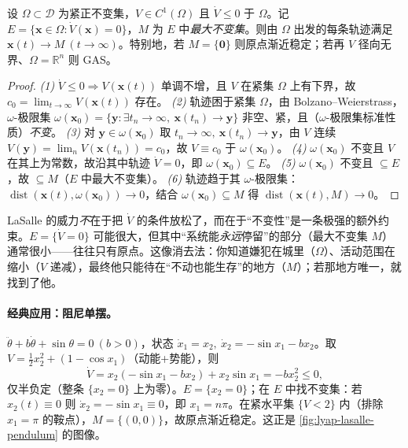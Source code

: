\begin{theorem}
\label{thm:lyap-lasalle-full}
设 $\Omega\subset\mathcal{D}$ 为紧正不变集，$V\in C^1(\Omega)$ 且 $\dot V\le0$ 于 $\Omega$。记 $E=\{\mathbf{x}\in\Omega:\dot V(\mathbf{x})=0\}$，$M$ 为 $E$ 中\emph{最大不变集}。则由 $\Omega$ 出发的每条轨迹满足 $\mathbf{x}(t)\to M\ (t\to\infty)$。特别地，若 $M=\{\mathbf{0}\}$ 则原点渐近稳定；若再 $V$ 径向无界、$\Omega=\mathbb{R}^n$ 则 GAS。
\end{theorem}

\begin{proof}
\emph{(1)} $\dot V\le0\Rightarrow V(\mathbf{x}(t))$ 单调不增，且 $V$ 在紧集 $\Omega$ 上有下界，故 $c_0=\lim_{t\to\infty}V(\mathbf{x}(t))$ 存在。
\emph{(2)} 轨迹困于紧集 $\Omega$，由 Bolzano–Weierstrass，$\omega$-极限集 $\omega(\mathbf{x}_0)=\{\mathbf{y}:\exists t_n\to\infty,\ \mathbf{x}(t_n)\to\mathbf{y}\}$ 非空、紧，且（$\omega$-极限集标准性质）\emph{不变}。
\emph{(3)} 对 $\mathbf{y}\in\omega(\mathbf{x}_0)$ 取 $t_n\to\infty,\ \mathbf{x}(t_n)\to\mathbf{y}$，由 $V$ 连续 $V(\mathbf{y})=\lim_n V(\mathbf{x}(t_n))=c_0$，故 $V\equiv c_0$ 于 $\omega(\mathbf{x}_0)$。
\emph{(4)} $\omega(\mathbf{x}_0)$ 不变且 $V$ 在其上为常数，故沿其中轨迹 $\dot V=0$，即 $\omega(\mathbf{x}_0)\subseteq E$。
\emph{(5)} $\omega(\mathbf{x}_0)$ 不变且 $\subseteq E$，故 $\subseteq M$（$E$ 中最大不变集）。
\emph{(6)} 轨迹趋于其 $\omega$-极限集：$\operatorname{dist}(\mathbf{x}(t),\omega(\mathbf{x}_0))\to0$，结合 $\omega(\mathbf{x}_0)\subseteq M$ 得 $\operatorname{dist}(\mathbf{x}(t),M)\to0$。
\end{proof}

\begin{insight}
LaSalle 的威力\emph{不}在于把 $\dot V$ 的条件放松了，而在于“不变性”是一条极强的额外约束。$E=\{\dot V=0\}$ 可能很大，但其中“系统能\emph{永远}停留”的部分（最大不变集 $M$）通常很小——往往只有原点。这像消去法：你知道嫌犯在城里（$\Omega$）、活动范围在缩小（$V$ 递减），最终他只能待在“不动也能生存”的地方（$M$）；若那地方唯一，就找到了他。
\end{insight}

\paragraph{经典应用：阻尼单摆。}
$\ddot\theta+b\dot\theta+\sin\theta=0\ (b>0)$，状态 $\dot x_1=x_2,\ \dot x_2=-\sin x_1-bx_2$。取 $V=\tfrac12 x_2^2+(1-\cos x_1)$（动能+势能），则
\begin{equation}
  \dot V=x_2(-\sin x_1-bx_2)+x_2\sin x_1=-bx_2^2\le0,
  \label{eq:lyap-pendulum-vdot}
\end{equation}
仅半负定（整条 $\{x_2=0\}$ 上为零）。$E=\{x_2=0\}$；在 $E$ 中找不变集：若 $x_2(t)\equiv0$ 则 $\dot x_2=-\sin x_1\equiv0$，即 $x_1=n\pi$。在紧水平集 $\{V<2\}$ 内（排除 $x_1=\pi$ 的鞍点），$M=\{(0,0)\}$，故原点渐近稳定。这正是 \cref{fig:lyap-lasalle-pendulum} 的图像。

